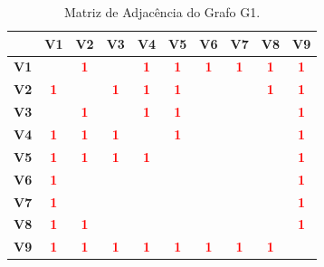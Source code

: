 \documentclass{report}
\begin{document}
\begin{table}[h]
    \centering
     \begin{tabular}{|c|c|c|c|c|c|c|c|c|c|}
        \hline
         & \textbf{V1} & \textbf{V2} & \textbf{V3} & \textbf{V4} & \textbf{V5} & \textbf{V6} & \textbf{V7} & \textbf{V8} & \textbf{V9} \\
        \hline 
        \textbf{V1} &  & \textbf{\textcolor{red}{1}} &  & \textbf{\textcolor{red}{1}} & \textbf{\textcolor{red}{1}} & \textbf{\textcolor{red}{1}} & \textbf{\textcolor{red}{1}} & \textbf{\textcolor{red}{1}} & \textbf{\textcolor{red}{1}} \\ 
        \hline
       \textbf{V2} & \textbf{\textcolor{red}{1}} &  & \textbf{\textcolor{red}{1}} & \textbf{\textcolor{red}{1}} & \textbf{\textcolor{red}{1}} &  &  & \textbf{\textcolor{red}{1}} & \textbf{\textcolor{red}{1}} \\
        \hline
       \textbf{V3} &  & \textbf{\textcolor{red}{1}} &  & \textbf{\textcolor{red}{1}} & \textbf{\textcolor{red}{1}} &  &  &  & \textbf{\textcolor{red}{1}} \\
        \hline
       \textbf{V4} & \textbf{\textcolor{red}{1}} & \textbf{\textcolor{red}{1}} & \textbf{\textcolor{red}{1}} &  & \textbf{\textcolor{red}{1}} &  &  &  & \textbf{\textcolor{red}{1}} \\
        \hline
        \textbf{V5} & \textbf{\textcolor{red}{1}} & \textbf{\textcolor{red}{1}} & \textbf{\textcolor{red}{1}} & \textbf{\textcolor{red}{1}} &  &  &  &  & \textbf{\textcolor{red}{1}} \\
        \hline
        \textbf{V6} & \textbf{\textcolor{red}{1}} &  &  &  &  &  &  &  & \textbf{\textcolor{red}{1}} \\
        \hline
        \textbf{V7} & \textbf{\textcolor{red}{1}} &  &  &  &  &  &  &  & \textbf{\textcolor{red}{1}}  \\
        \hline
        \textbf{V8} & \textbf{\textcolor{red}{1}} & \textbf{\textcolor{red}{1}} &  &  &  &  &  &  & \textbf{\textcolor{red}{1}} \\
        \hline
        \textbf{V9} & \textbf{\textcolor{red}{1}} & \textbf{\textcolor{red}{1}} & \textbf{\textcolor{red}{1}} & \textbf{\textcolor{red}{1}} & \textbf{\textcolor{red}{1}} & \textbf{\textcolor{red}{1}} & \textbf{\textcolor{red}{1}} & \textbf{\textcolor{red}{1}} & \\
        \hline
      \end{tabular}
    \caption{Matriz de Adjacência do Grafo G1.}
\end{table}
\end{document}
